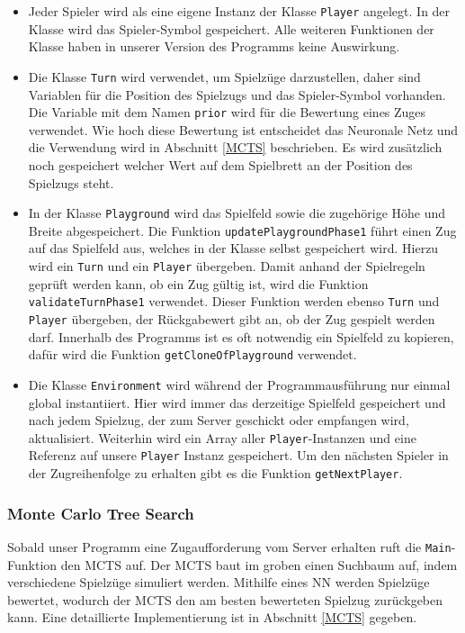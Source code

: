 \documentclass[12pt,a4paper]{article}
\begin{document}
\begin{itemize}

\item{Jeder Spieler wird als eine eigene Instanz der Klasse \texttt{Player} angelegt. In der Klasse wird das Spieler-Symbol gespeichert. Alle weiteren Funktionen der Klasse haben in unserer Version des Programms keine Auswirkung.}

\item{Die Klasse \texttt{Turn} wird verwendet, um Spielzüge darzustellen, daher sind Variablen für die Position des Spielzugs und das Spieler-Symbol vorhanden. Die Variable mit dem Namen \texttt{prior} wird für die Bewertung eines Zuges verwendet. Wie hoch diese Bewertung ist entscheidet das Neuronale Netz und die Verwendung wird in Abschnitt \ref{MCTS} beschrieben. Es wird zusätzlich noch gespeichert welcher Wert auf dem Spielbrett an der Position des Spielzugs steht.}

\item{In der Klasse \texttt{Playground} wird das Spielfeld sowie die zugehörige Höhe und Breite abgespeichert. Die Funktion \texttt{updatePlaygroundPhase1} führt einen Zug auf das Spielfeld aus, welches in der Klasse selbst gespeichert wird. Hierzu wird ein \texttt{Turn} und ein \texttt{Player} übergeben. Damit anhand der Spielregeln geprüft werden kann, ob ein Zug gültig ist, wird die Funktion \texttt{validateTurnPhase1} verwendet. Dieser Funktion werden ebenso \texttt{Turn} und \texttt{Player} übergeben, der Rückgabewert gibt an, ob der Zug gespielt werden darf. Innerhalb des Programms ist es oft notwendig ein Spielfeld zu kopieren, dafür wird die Funktion \texttt{getCloneOfPlayground} verwendet.}

\item{Die Klasse \texttt{Environment} wird während der Programmausführung nur einmal global instantiiert. Hier wird immer das derzeitige Spielfeld gespeichert und nach jedem Spielzug, der zum Server geschickt oder empfangen wird, aktualisiert. Weiterhin wird ein Array aller \texttt{Player}-Instanzen und eine Referenz auf unsere \texttt{Player} Instanz gespeichert. Um den nächsten Spieler in der Zugreihenfolge zu erhalten gibt es die Funktion \texttt{getNextPlayer}.}

\end{itemize}

\subsubsection{Monte Carlo Tree Search}
Sobald unser Programm eine Zugaufforderung vom Server erhalten ruft die \texttt{Main}-Funktion den MCTS auf. Der MCTS baut im groben einen Suchbaum auf, indem verschiedene Spielzüge simuliert werden. Mithilfe eines NN werden Spielzüge bewertet, wodurch der MCTS den am besten bewerteten Spielzug zurückgeben kann. Eine detaillierte Implementierung ist in Abschnitt \ref{MCTS} gegeben.
\end{document}
